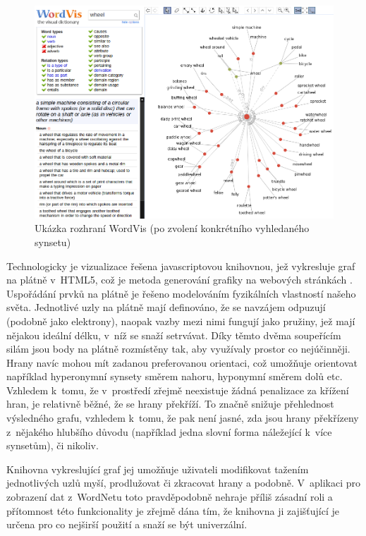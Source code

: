 \documentclass[a4paper,11pt,openany,twoside]{book}
\begin{document}
					\begin{figure}[h]
						\centering
						\includegraphics[width=1.0\textwidth]{wordvis.png}
						\caption{Ukázka rozhraní WordVis (po zvolení konkrétního vyhledaného synsetu)}
						\label{fig:wordvis}
					\end{figure}

					Technologicky je vizualizace řešena javascriptovou knihovnou, jež vykresluje graf na plátně v~HTML5, což je metoda generování grafiky na webových stránkách \parencite{w3schools2017htmlcanvas}. Uspořádání prvků na plátně je řešeno modelováním fyzikálních vlastností našeho světa. Jednotlivé uzly na plátně mají definováno, že se navzájem odpuzují (podobně jako elektrony), naopak vazby mezi nimi fungují jako pružiny, jež mají nějakou ideální délku, v~níž se snaží setrvávat. Díky těmto dvěma soupeřícím silám jsou body na plátně rozmístěny tak, aby využívaly prostor co nejúčinněji. Hrany navíc mohou mít zadanou preferovanou orientaci, což umožňuje orientovat například hyperonymní synsety směrem nahoru, hyponymní směrem dolů etc. \parencite{wordvis2010vercruysse} Vzhledem k~tomu, že v~prostředí zřejmě neexistuje žádná penalizace za křížení hran, je relativně běžné, že se hrany překříží. To značně snižuje přehlednost výsledného grafu, vzhledem k~tomu, že pak není jasné, zda jsou hrany překřízeny z~nějakého hlubšího důvodu (například jedna slovní forma náležející k~více synsetům), či nikoliv. 

					Knihovna vykreslující graf jej umožňuje uživateli modifikovat tažením jednotlivých uzlů myší, prodlužovat či zkracovat hrany a podobně. V~aplikaci pro zobrazení dat z~WordNetu toto pravděpodobně nehraje příliš zásadní roli a přítomnost této funkcionality je zřejmě dána tím, že knihovna ji zajišťující je určena pro co nejširší použití a snaží se být univerzální. \parencite{wordvis2010vercruysse}
\end{document}
